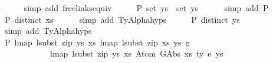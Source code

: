 \begin{isabellebody}
\ \ \ \ \isamarkupfalse%
\ {\isacharparenleft}{\kern0pt}simp\ add{\isacharcolon}{\kern0pt}\ freelinks{\isacharunderscore}{\kern0pt}equiv{\isacharparenright}{\kern0pt}\isanewline
\ \ \isamarkupfalse%
\ \isamarkupfalse%
\ P{}{\isacharcolon}{\kern0pt}\ {\isachardoublequoteopen}set\ ys{\isacharprime}{\kern0pt}\ {\isacharequal}{\kern0pt}\ set\ ys{\isachardoublequoteclose}\isanewline
\ \ \ \ \isamarkupfalse%
\ {\isacharparenleft}{\kern0pt}simp\ add{\isacharcolon}{\kern0pt}\ P{}{\isacharparenright}{\kern0pt}\isanewline
\isanewline
\ \ \isamarkupfalse%
\ \isamarkupfalse%
\ P{}{\isacharcolon}{\kern0pt}\ {\isachardoublequoteopen}distinct\ xs{\isacharprime}{\kern0pt}{\isachardoublequoteclose}\isanewline
\ \ \ \ \isamarkupfalse%
\ {\isacharparenleft}{\kern0pt}simp\ add{\isacharcolon}{\kern0pt}\ TyAlpha{\isachardot}{\kern0pt}hyps{\isacharparenleft}{\kern0pt}{}{\isacharparenright}{\kern0pt}{\isacharparenright}{\kern0pt}\isanewline
\ \ \isamarkupfalse%
\ \isamarkupfalse%
\ P{}{\isacharcolon}{\kern0pt}\ {\isachardoublequoteopen}distinct\ ys{\isacharprime}{\kern0pt}{\isachardoublequoteclose}\isanewline
\ \ \ \ \isamarkupfalse%
\ {\isacharparenleft}{\kern0pt}simp\ add{\isacharcolon}{\kern0pt}\ TyAlpha{\isachardot}{\kern0pt}hyps{\isacharparenleft}{\kern0pt}{}{\isacharparenright}{\kern0pt}{\isacharparenright}{\kern0pt}\isanewline
\isanewline
\ \ \isamarkupfalse%
\ P{}{\isacharcolon}{\kern0pt}\ {\isachardoublequoteopen}lmap\ {\isacharparenleft}{\kern0pt}lsubst\ {\isacharparenleft}{\kern0pt}zip\ ys{\isacharprime}{\kern0pt}\ xs{\isacharprime}{\kern0pt}{\isacharparenright}{\kern0pt}{\isacharparenright}{\kern0pt}\ {\isacharparenleft}{\kern0pt}lmap\ {\isacharparenleft}{\kern0pt}lsubst\ {\isacharparenleft}{\kern0pt}zip\ xs{\isacharprime}{\kern0pt}\ ys{\isacharprime}{\kern0pt}{\isacharparenright}{\kern0pt}{\isacharparenright}{\kern0pt}\ g{\isacharparenright}{\kern0pt}\ {\isasymsimeq}\isanewline
\ \ \ \ \ \ \ \ \ \ \ \ lmap\ {\isacharparenleft}{\kern0pt}lsubst\ {\isacharparenleft}{\kern0pt}zip\ ys{\isacharprime}{\kern0pt}\ xs{\isacharprime}{\kern0pt}{\isacharparenright}{\kern0pt}{\isacharparenright}{\kern0pt}\ {\isacharparenleft}{\kern0pt}Atom\ {\isacharparenleft}{\kern0pt}GAbs\ xs\ ty{}{\isacharprime}{\kern0pt}\ e{\isacharparenright}{\kern0pt}\ ys{\isacharparenright}{\kern0pt}{\isachardoublequoteclose}\isanewline

\end{isabellebody}
